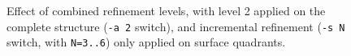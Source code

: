 \documentclass[10pt]{article}
\begin{document}
%
\begin{figure}[htb]
\centering
\centering
\centering
\centering
 \caption{Effect of combined refinement levels, with level 2 applied on the complete structure (\texttt{-a 2} switch), and incremental refinement (\texttt{-s N} switch, with \texttt{N=3..6}) only applied on surface quadrants.}
\label{fig:pierefs}
\end{figure}
\end{document}
